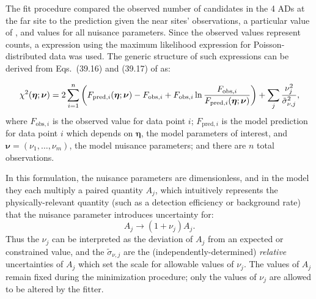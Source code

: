 The fit procedure compared the observed number of \nuebar{} candidates
in the 4 ADs at the far site to the prediction
given the near sites' observations, a particular value of \thetaot{},
and values for all nuisance parameters.
Since the observed values represent counts,
a \chisquare{} expression using the maximum likelihood expression
for Poisson-distributed data was used.
The generic structure of such \chisquare{} expressions
can be derived from Eqs.~(39.16) and (39.17) of \cite{pdg} as:

\begin{equation}
    \label{eq:chisquare_generic}
    \chi^2(\boldsymbol{\eta};\boldsymbol{\nu}) = 2\sum_{i=1}^{n} \left(
        F_{\text{pred},i}(\boldsymbol{\eta};\boldsymbol{\nu}) - F_{\text{obs},i}
        + F_{\text{obs},i}\ln
        \frac{F_{\text{obs},i}}{F_{\text{pred},i}(\boldsymbol{\eta};\boldsymbol{\nu})}
        \right)
        +
        \sum_j \frac{\nu_j^2}{\tilde{\sigma}_{\nu,j}^2},
\end{equation}
where $F_{\text{obs},i}$ is the observed value for data point $i$;
$F_{\text{pred},i}$
is the model prediction for data point $i$
which depends on $\boldsymbol{\eta}$, the model parameters of interest,
and $\boldsymbol{\nu}=(\nu_1, \ldots, \nu_m)$,
the model nuisance parameters;
and there are $n$ total observations.

In this formulation, the nuisance parameters are dimensionless,
and in the model they each multiply a paired quantity $A_j$,
which intuitively represents the physically-relevant quantity
(such as a detection efficiency or background rate)
that the nuisance parameter introduces uncertainty for:
\begin{equation}
    A_j \to (1+\nu_j)A_j.
\end{equation}
Thus the $\nu_j$ can be interpreted as the deviation of $A_j$
from an expected or constrained value,
and the $\tilde{\sigma}_{\nu,j}$ are the (independently-determined)
\emph{relative} uncertainties of $A_j$
which set the scale for allowable values of $\nu_j$.
The values of $A_j$ remain fixed during the minimization procedure;
only the values of $\nu_j$ are allowed to be altered by the fitter.

